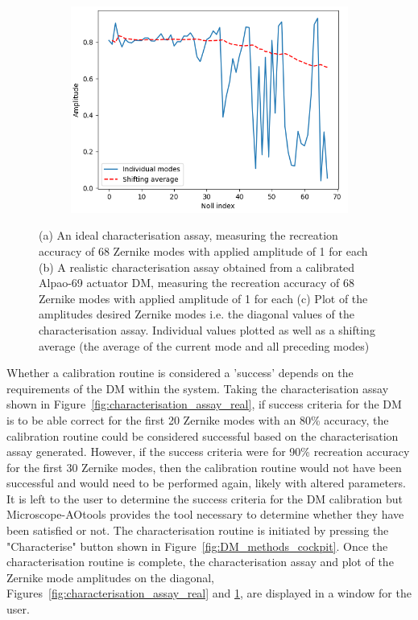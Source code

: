 \begin{figure}[h]
	\begin{subfigure}{0.9\textwidth}
		\centering
		\includegraphics[width=0.5\linewidth, scale=0.5]{./images/characterisation_assay_real_diag_and_avg.png}
		\caption{}
		\label{fig:characterisation_assay_ideal_diag_and_avg}
	\end{subfigure}
	\caption{(a) An ideal characterisation assay, measuring the recreation accuracy of 68 Zernike modes with applied amplitude of 1 for each (b) A realistic characterisation assay obtained from a calibrated Alpao-69 actuator DM, measuring the recreation accuracy of 68 Zernike modes with applied amplitude of 1 for each (c) Plot of the amplitudes desired Zernike modes i.e. the diagonal values of the characterisation assay. Individual values plotted as well as a shifting average (the average of the current mode and all preceding modes)}
	\label{fig:characterisation_assay_results}
\end{figure}

Whether a calibration routine is considered a 'success' depends on the requirements of the DM within the system. Taking the characterisation assay shown in Figure~\ref{fig:characterisation_assay_real}, if success criteria for the DM is to be able correct for the first 20 Zernike modes with an 80\% accuracy, the calibration routine could be considered successful based on the characterisation assay generated. However, if the success criteria were for 90\% recreation accuracy for the first 30 Zernike modes, then the calibration routine would not have been successful and would need to be performed again, likely with altered parameters. It is left to the user to determine the success criteria for the DM calibration but Microscope-AOtools provides the tool necessary to determine whether they have been satisfied or not. The characterisation routine is initiated by pressing the "Characterise" button shown in Figure~\ref{fig:DM_methods_cockpit}. Once the characterisation routine is complete, the characterisation assay and plot of the Zernike mode amplitudes on the diagonal, Figures~\ref{fig:characterisation_assay_real} and \ref{fig:characterisation_assay_ideal_diag_and_avg}, are displayed in a window for the user.

